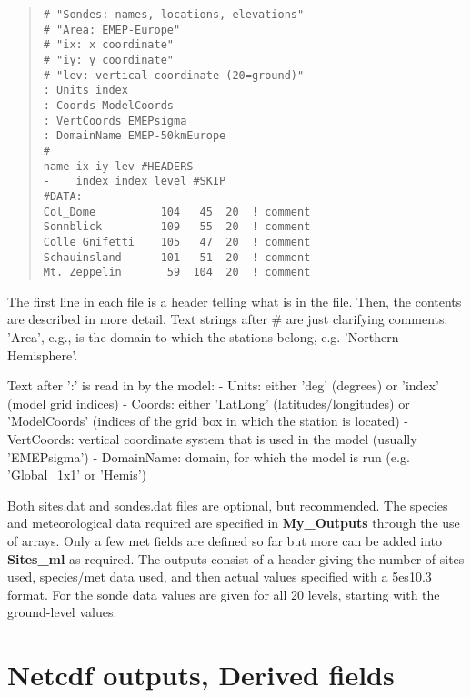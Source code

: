 \begin{small}
\begin{quote}
\begin{verbatim}
# "Sondes: names, locations, elevations"
# "Area: EMEP-Europe"
# "ix: x coordinate"
# "iy: y coordinate"
# "lev: vertical coordinate (20=ground)"
: Units index
: Coords ModelCoords
: VertCoords EMEPsigma
: DomainName EMEP-50kmEurope
#
name ix iy lev #HEADERS
-    index index level #SKIP
#DATA:
Col_Dome          104   45  20  ! comment
Sonnblick         109   55  20  ! comment
Colle_Gnifetti    105   47  20  ! comment
Schauinsland      101   51  20  ! comment
Mt._Zeppelin       59  104  20  ! comment
\end{verbatim}

\end{quote}
\end{small}

The first line in each file is a header telling what is in the file.
Then, the contents are described in more detail. Text strings after
\# are just clarifying comments. 'Area', e.g., is the domain to which
the stations belong, e.g. 'Northern Hemisphere'.

Text after ':' is read in by the model:\newline
- Units: either 'deg' (degrees) or 'index' (model grid indices)\newline
- Coords: either 'LatLong' (latitudes/longitudes) or 'ModelCoords'
(indices of the grid box in which the station is located)\newline
- VertCoords: vertical coordinate system that is used in the model (usually
'EMEPsigma')\newline
- DomainName: domain, for which the model is run (e.g. 'Global\_1x1' or 'Hemis')\newline


Both sites.dat and sondes.dat files are optional, but recommended.
\newline
The species and meteorological data required are specified in {\bf My\_Outputs}
through the use of arrays. Only a few met fields are defined so far but
more can be added into {\bf Sites\_ml} as required. The outputs consist
of a header giving the number of sites used, species/met data used, and
then actual values specified with a 5es10.3 format. For the sonde data
values are given for all 20 levels, starting with the ground-level values.




\section{Netcdf outputs, Derived fields}

